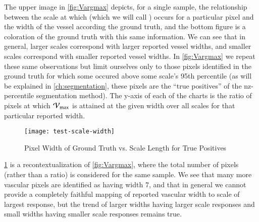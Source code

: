 %
The upper image in \cref{fig:Vargmax} depicts, for a single sample, the relationship between the scale at which \Vmax (which we will call \Vargmax) occurs for a particular pixel and the width of the vessel according the ground truth, and the bottom figure is a coloration of the ground truth with this same information. We can see that in general, larger scales correspond with larger reported vessel widths, and smaller scales correspond with smaller reported vessel widths.
In \cref{fig:Vargmax} we repeat these same observations but limit ourselves only to those pixels identified in the ground truth for which some \Vsigma  occured above some scale's 95th percentile (as will be explained in \cref{ch:segmentation}, these pixels are the ``true positives'' of the nz-percentile segmentation method). The y-axis of each of the charts is the ratio of pixels at which $\mathcal{V}_{\max}$ is attained at the given width over all scales for that particular reported width.



\begin{figure}[p]
  \texttt{[image: test-scale-width]}
  \caption{Pixel Width of Ground Truth vs. Scale Length for True Positives}
  \label{fig:scale_for_max_frangi_score_seaborn}
\end{figure}

\cref{fig:scale_for_max_frangi_score_seaborn} is a recontextualization of \cref{fig:Vargmax}, where the total number of pixels (rather than a ratio) is considered for the same sample.
We see that many more vascular pixels are identified as having width 7, and that in general we cannot provide a completely faithful mapping of reported vascular width to scale of largest response, but the trend of larger widths having larger scale responses and small widths having smaller scale responses remains true.
